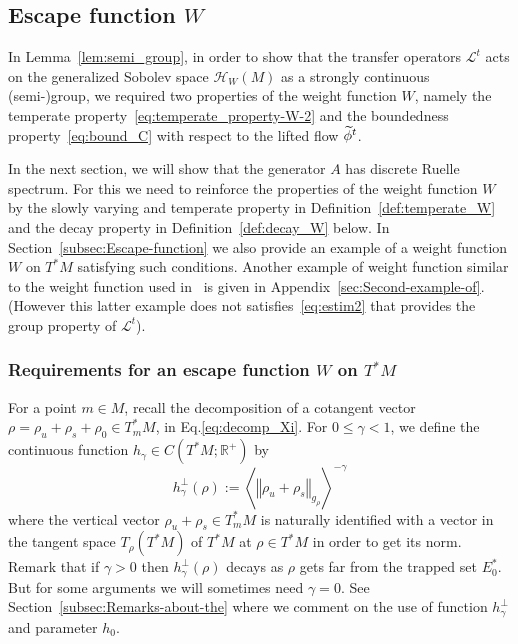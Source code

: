 \documentclass[10pt]{amsart}
\theoremstyle{definition}\newtheorem{defi}[theo]{Definition}\newtheorem{rema}[theo]{Remark}\newtheorem{exam}[theo]{Example}\newtheorem{exem}[theo]{Example}\newtheorem{nota}[theo]{Notation}
\newcommand{\clH}{\mathcal{H}}
\newcommand{\clL}{\mathcal{L}}
\newcommand{\bbR}{\mathbb{R}}
\let\oldtilde\tilde
\renewcommand*{\tilde}[1]{\mathchoice{\widetilde{#1}}{\widetilde{#1}}{\oldtilde{#1}}{\oldtilde{#1}}}
\begin{document}
\subsection{Escape function \texorpdfstring{$W$}{W}}
\label{subsec:Escape-function-}
In Lemma~\ref{lem:semi_group}, in order to show that the transfer operators $\clL^{t}$ acts on the generalized Sobolev space $\clH _{W}(M)$ as a strongly continuous (semi-)group, we required two properties of the weight function $W$, namely the temperate property~\eqref{eq:temperate_property-W-2} and the boundedness property~\eqref{eq:bound_C} with respect to the lifted flow $\tilde{\phi}^{t}$.

In the next section, we will show that the generator $A$ has discrete Ruelle spectrum. For this we need to reinforce the properties of the weight function $W$ by the slowly varying and temperate property in Definition~\ref{def:temperate_W} and the decay property in Definition~\ref{def:decay_W} below. In Section~\ref{subsec:Escape-function} we also provide an example of a weight function $W$ on $T^{*}M$ satisfying such conditions. Another example of weight function similar to the weight function used in~\cite{fred-roy-sjostrand-07,fred_flow_09} is given in Appendix~\ref{sec:Second-example-of}. (However this latter example does not satisfies~\eqref{eq:estim2} that provides the group property of $\clL^{t}$).

\subsubsection{Requirements for an escape function \texorpdfstring{$W$}{W} on \texorpdfstring{$T^{*}M$}{T*M}}

For a point $m\in M$, recall the decomposition of a cotangent vector $\rho=\rho_{u}+\rho_{s}+\rho_{0}\in T_{m}^{*}M$, in Eq.\eqref{eq:decomp_Xi}. For $0\leq\gamma<1$, we define the continuous function $h_{\gamma}\in C(T^{*}M;\bbR^{+})$ by
\begin{equation}\label{eq:h_gamma}
h_{\gamma}^{\perp}\left(\rho\right):=\left\langle \left\Vert \rho_{u}+\rho_{s}\right\Vert _{g_{\rho}}\right\rangle ^{-\gamma}
\end{equation}
where the vertical vector $\rho_{u}+\rho_{s}\in T_{m}^{*}M$ is naturally identified with a vector in the tangent space $T_{\rho}(T^{*}M)$ of $T^{*}M$ at $\rho\in T^{*}M$ in order to get its norm. Remark that if $\gamma>0$ then $h_{\gamma}^{\perp}(\rho)$ decays as $\rho$ gets far from the trapped set $E_{0}^{*}$. But for some arguments we will sometimes need $\gamma=0$. See Section~\ref{subsec:Remarks-about-the} where we comment on the use of function $h_{\gamma}^{\perp}$ and parameter $h_{0}$.
\end{document}
